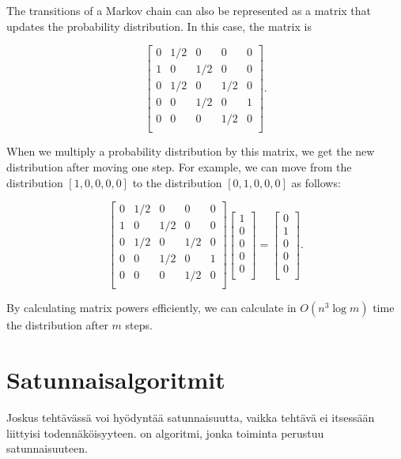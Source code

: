 The transitions of a Markov chain can also be
represented as a matrix that updates the
probability distribution.
In this case, the matrix is

\[ 
 \begin{bmatrix}
  0 & 1/2 & 0 & 0 & 0 \\
  1 & 0 & 1/2 & 0 & 0 \\
  0 & 1/2 & 0 & 1/2 & 0 \\
  0 & 0 & 1/2 & 0 & 1 \\
  0 & 0 & 0 & 1/2 & 0 \\
 \end{bmatrix}.
\]

When we multiply a probability distribution by this matrix,
we get the new distribution after moving one step.
For example, we can move from the distribution
$[1,0,0,0,0]$ to the distribution
$[0,1,0,0,0]$ as follows:

\[ 
 \begin{bmatrix}
  0 & 1/2 & 0 & 0 & 0 \\
  1 & 0 & 1/2 & 0 & 0 \\
  0 & 1/2 & 0 & 1/2 & 0 \\
  0 & 0 & 1/2 & 0 & 1 \\
  0 & 0 & 0 & 1/2 & 0 \\
 \end{bmatrix}
 \begin{bmatrix}
  1 \\
  0 \\
  0 \\
  0 \\
  0 \\
 \end{bmatrix}
=
 \begin{bmatrix}
  0 \\
  1 \\
  0 \\
  0 \\
  0 \\
 \end{bmatrix}.
\]

By calculating matrix powers efficiently,
we can calculate in $O(n^3 \log m)$ time
the distribution after $m$ steps.

\section{Satunnaisalgoritmit}


Joskus tehtävässä voi hyödyntää satunnaisuutta,
vaikka tehtävä ei itsessään liittyisi todennäköisyyteen.
 on algoritmi, jonka toiminta
perustuu satunnaisuuteen.

